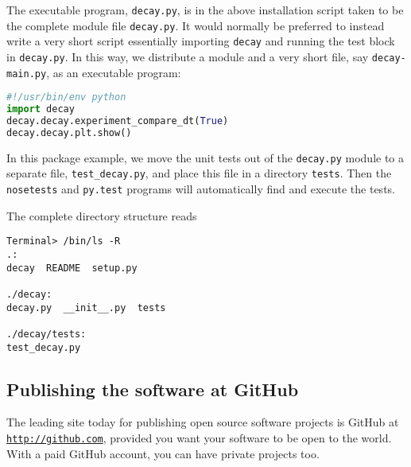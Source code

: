 \documentclass[graybox,sectrefs,envcountresetchap,open=right,final]{svmonodo}
\newenvironment{notice_mdfboxadmon}[1][]{
\begin{notice_mdfboxmdframed}[frametitle=#1]
}
{
\end{notice_mdfboxmdframed}
}
\begin{document}
\begin{notice_mdfboxadmon}
The executable program, \texttt{decay.py}, is in the above installation
script taken to be the complete
module file \texttt{decay.py}. It would normally be preferred to instead
write a very short script essentially importing \texttt{decay} and running
the test block in \texttt{decay.py}.  In this way, we distribute a module and
a very short file, say \texttt{decay-main.py}, as an executable program:






\begin{lstlisting}[language=python,style=blue1bar_bluegreen]
#!/usr/bin/env python
import decay
decay.decay.experiment_compare_dt(True)
decay.decay.plt.show()

\end{lstlisting}
\end{notice_mdfboxadmon} %



In this package example, we move the unit tests out of the \texttt{decay.py}
module to a separate file, \Verb!test_decay.py!, and place this file in a
directory \texttt{tests}. Then the \texttt{nosetests} and \texttt{py.test} programs will
automatically find and execute the tests.

The complete directory structure reads











\begin{Verbatim}[frame=lines,label=\fbox{{\tiny Terminal}},framesep=2.5mm,framerule=0.7pt,fontsize=\fontsize{9pt}{9pt}]
Terminal> /bin/ls -R
.:
decay  README  setup.py

./decay:
decay.py  __init__.py  tests

./decay/tests:
test_decay.py

\end{Verbatim}


\subsection{Publishing the software at GitHub}


The leading site today for publishing open source software projects is
GitHub at \href{{http://github.com}}{\nolinkurl{http://github.com}}, provided you want your software to
be open to the world. With a paid GitHub account, you can have private
projects too.
\end{document}
